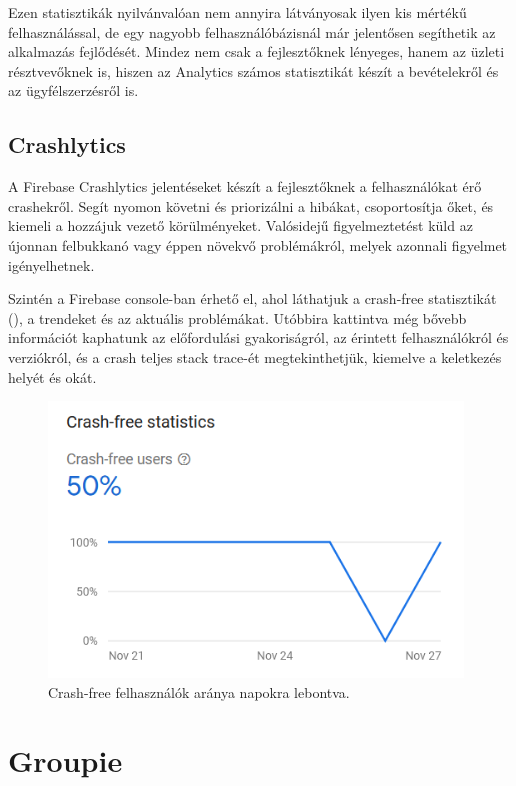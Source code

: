 Ezen statisztikák nyilvánvalóan nem annyira látványosak ilyen kis mértékű felhasználással, de egy nagyobb felhasználóbázisnál már jelentősen segíthetik az alkalmazás fejlődését. Mindez nem csak a fejlesztőknek lényeges, hanem az üzleti résztvevőknek is, hiszen az Analytics számos statisztikát készít a bevételekről és az ügyfélszerzésről is.

\subsection{Crashlytics}
A Firebase Crashlytics jelentéseket készít a fejlesztőknek a felhasználókat érő crashekről. Segít nyomon követni és priorizálni a hibákat, csoportosítja őket, és kiemeli a hozzájuk vezető körülményeket. Valósidejű figyelmeztetést küld az újonnan felbukkanó vagy éppen növekvő problémákról, melyek azonnali figyelmet igényelhetnek. \cite{Crashlytics}

Szintén a Firebase console-ban érhető el, ahol láthatjuk a crash-free statisztikát (), a trendeket és az aktuális problémákat. Utóbbira kattintva még bővebb információt kaphatunk az előfordulási gyakoriságról, az érintett felhasználókról és verziókról, és a crash teljes stack trace-ét megtekinthetjük, kiemelve a keletkezés helyét és okát.

\begin{figure}[!ht]
	\centering
	\includegraphics[width=110mm, keepaspectratio]{figures/crashlytics_crashfree.png}
	\caption{Crash-free felhasználók aránya napokra lebontva.}
	\label{fig:CrashlyticsCrashfree}
\end{figure}

\section{Groupie}

